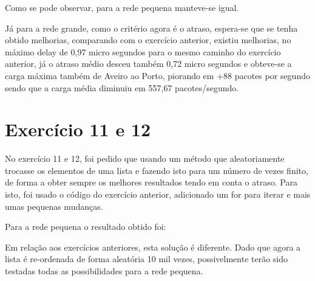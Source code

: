 \documentclass[pdftex,12pt,a4paper]{report}
\begin{document}


Como se pode observar, para a rede pequena manteve-se igual.

Já para a rede grande, como o critério agora é o atraso, espera-se que se tenha obtido melhorias, comparando com o exercício anterior, existiu melhorias, no máximo delay de 0,97 micro segundos para o mesmo caminho do exercício anterior, já o atraso médio desceu também 0,72 micro segundos e obteve-se a carga máxima também de Aveiro ao Porto, piorando em +88 pacotes por segundo sendo que a carga média diminuiu em 557,67 pacotes/segundo.






\section{Exercício 11 e 12}

No exercício 11 e 12, foi pedido que usando um método que aleatoriamente trocasse os elementos de uma lista e fazendo isto para um número de vezes finito, de forma a obter sempre os melhores resultados tendo em conta o atraso. Para isto, foi usado o código do exercício anterior, adicionado um for para iterar e mais umas pequenas mudanças.

Para a rede pequena o resultado obtido foi:



Em relação aos exercícios anteriores, esta solução é diferente. Dado que agora a lista é re-ordenada de forma aleatória 10 mil vezes, possivelmente terão sido testadas todas as possibilidades para a rede pequena.






\newpage
\end{document}
